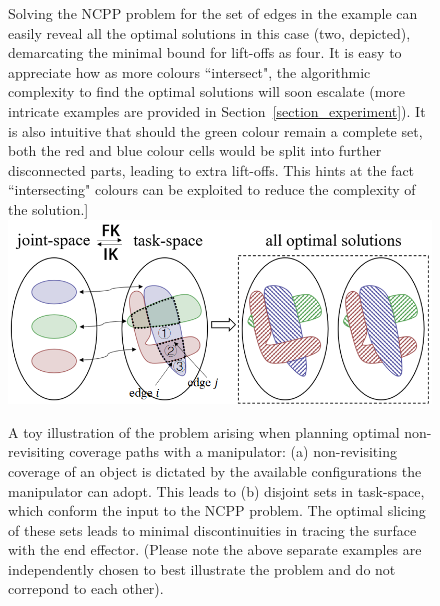 \documentclass[journal]{IEEEtran}
\begin{document}
\begin{figure}[t]
Solving the NCPP problem for the set of edges in the example can easily reveal all the optimal solutions in this case (two, depicted), demarcating the minimal bound for lift-offs as four. 
It is easy to appreciate how as more colours ``intersect", the algorithmic complexity to find the optimal solutions will soon escalate (more intricate examples are provided in Section~\ref{section_experiment}). It is also intuitive that should the green colour remain a complete set, both the red and blue colour cells would be split into further disconnected parts, 
leading to extra lift-offs. This hints at the fact ``intersecting" colours can be exploited to reduce the complexity of the solution.]{
	\includegraphics[width = 0.97\columnwidth]{figures/mapping_2}
	\label{fig:toy_coverage_graph_example}
}
\caption{A toy illustration of the problem arising when planning optimal non-revisiting coverage paths with a manipulator: (a) non-revisiting coverage of an object is dictated by the 
available configurations the manipulator can adopt. This leads to (b) disjoint sets in task-space, which conform the input to the NCPP problem. The optimal slicing of these sets leads to minimal discontinuities in tracing the surface with the end effector. (Please note the above separate examples are independently chosen to best illustrate the problem and do not correpond to each other).
}
\label{fig:mapping}
\end{figure}
\end{document}
